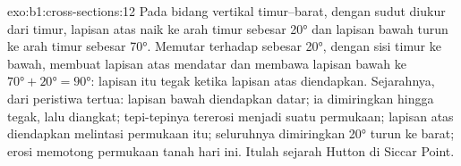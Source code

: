 \begin{solution}{exo:b1:cross-sections:12}
Pada bidang vertikal timur--barat, dengan sudut diukur dari timur, lapisan atas naik ke arah timur sebesar \ang{20} dan lapisan bawah turun ke arah timur sebesar \ang{70}. Memutar  terhadap  sebesar \ang{20}, dengan sisi timur ke bawah, membuat lapisan atas mendatar dan membawa lapisan bawah ke $\ang{70} + \ang{20} = \ang{90}$: lapisan itu tegak ketika lapisan atas diendapkan. Sejarahnya, dari peristiwa tertua: lapisan bawah diendapkan datar; ia dimiringkan hingga tegak, lalu diangkat; tepi-tepinya tererosi menjadi suatu permukaan; lapisan atas diendapkan melintasi permukaan itu; seluruhnya dimiringkan \ang{20} turun ke barat; erosi memotong permukaan tanah hari ini. Itulah sejarah  Hutton di Siccar Point.
\end{solution}


